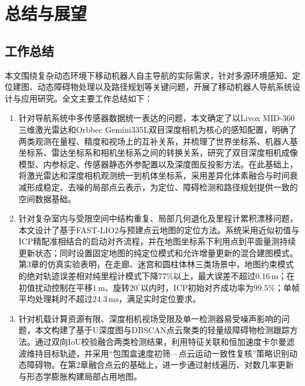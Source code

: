 \chapter{总结与展望}

\section{工作总结}
本文围绕复杂动态环境下移动机器人自主导航的实际需求，针对多源环境感知、定位建图、动态障碍物处理以及路径规划等关键问题，开展了移动机器人导航系统设计与应用研究。全文主要工作总结如下：

\begin{enumerate}[label=(\arabic*)]
\item 针对导航系统中多传感器数据统一表达的问题，本文确定了以Livox MID-360三维激光雷达和Orbbec Gemini335L双目深度相机为核心的感知配置，明确了两类观测在量程、精度和视场上的互补关系，并梳理了世界坐标系、机器人基坐标系、雷达坐标系和相机坐标系之间的转换关系，研究了双目深度相机成像模型、内参标定、传感器静态外参配置以及深度图反投影方法。在此基础上，将激光雷达和深度相机观测统一到机体坐标系，采用差异化体素融合与时间衰减形成稳定、去噪的局部点云表示，为定位、障碍检测和路径规划提供一致的空间数据基础。

\item 针对复杂室内与受限空间中结构重复、局部几何退化及里程计累积漂移问题，本文设计了基于FAST-LIO2与预建点云地图的定位方法。系统采用近似初值与ICP精配准相结合的启动对齐流程，并在地图坐标系下利用点到平面量测持续更新状态；同时设置固定地图的纯定位模式和允许增量更新的混合建图模式。第3章的仿真实验表明，在走廊、迷宫和圆柱体林三类场景中，地图约束模式的绝对轨迹误差相对纯里程计模式下降$77\%$以上，最大误差不超过$0.16\,\mathrm{m}$；在初值扰动控制在平移$1\,\mathrm{m}$、旋转$20^{\circ}$以内时，ICP初始对齐成功率为$99.5\%$；单帧平均处理耗时不超过$24.3\,\mathrm{ms}$，满足实时定位要求。

\item 针对机载计算资源有限、深度相机视场受限及单一检测器易受噪声影响的问题，本文构建了基于U深度图与DBSCAN点云聚类的轻量级障碍物检测跟踪方法。通过双向IoU校验融合两类检测结果，利用特征关联和恒加速度卡尔曼滤波维持目标轨迹，并采用“包围盒速度初筛—点云运动一致性复核”策略识别动态障碍物。在第2章融合点云的基础上，进一步通过射线遍历、对数几率更新与形态学膨胀构建局部占用地图。


\end{enumerate}

